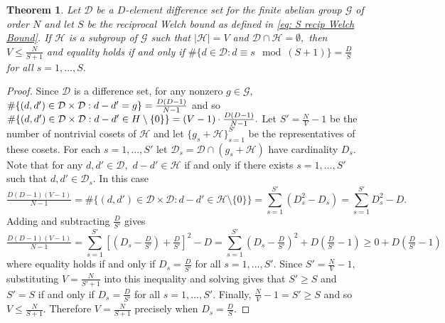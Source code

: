\documentclass[3p,11pt]{elsarticle}
\newcommand{\bbC}{\mathbb{C}}
\newcommand{\bfx}{\mathbf{x}}
\newcommand{\calD}{\mathcal{D}}
\newcommand{\calG}{\mathcal{G}}
\newcommand{\calH}{\mathcal{H}}
\newcommand{\abs}[1]{|{#1}|}
\newtheorem{theorem}{Theorem}[section]
\theoremstyle{definition}
\begin{document}
\begin{theorem}
\label{thm:Maximum V} 
Let $\calD$ be a $D$-element difference set for the finite abelian group $\calG$ of order $N$ and let $S$ be the reciprocal Welch bound as defined in \eqref{eq: S recip Welch Bound}. If $\calH$ is a subgroup of $\calG$ such that $\abs{\calH}=V$ and $\calD\cap\calH=\emptyset,$ then $V\leq\tfrac{N}{S+1}$ and equality holds if and only if $\#\{d\in\calD:d\equiv s\mod(S+1)\}=\tfrac{D}{S}$ for all $s=1,...,S.$
\end{theorem}
\begin{proof}
Since $\calD$ is a difference set, for any nonzero $g\in\calG,$ $\#\{(d,d')\in\calD\times\calD:d-d'=g\}=\smash{\tfrac{D(D-1)}{N-1}}$ and so $\#\{(d,d')\in\calD\times\calD:d-d'\in H\setminus\{0\}\}=(V-1)\cdot\smash{\tfrac{D(D-1)}{N-1}}.$ Let $S'=\tfrac{N}{V}-1$ be the number of nontrivial cosets of $\calH$ and let $\{g_s+\calH\}_{s=1}^{S'}$ be the representatives of these cosets. For each $s=1,...,S'$ let $\calD_s=\calD\cap(g_s+\calH)$ have cardinality $D_s.$ Note that for any $d,d'\in\calD,$ $d-d'\in\calH$ if and only if there exists $s=1,...,S'$ such that $d,d'\in\calD_s.$ In this case
\begin{equation*}
\tfrac{D(D-1)(V-1)}{N-1}=\#\{(d,d')\in\calD\times\calD:d-d'\in\calH\setminus\{0\}\}=\sum_{s=1}^{S'}(D_s^2-D_s)=\sum_{s=1}^{S'}D_s^2-D.
\end{equation*}
Adding and subtracting $\tfrac{D}{S'}$ gives
\begin{equation*}
\tfrac{D(D-1)(V-1)}{N-1}=\sum_{s=1}^{S'}\left[\left(D_s-\tfrac{D}{S'}\right)+\tfrac{D}{S'}\right]^2-D=\sum_{s=1}^{S'}\left(D_s-\tfrac{D}{S'}\right)^2+D\left(\tfrac{D}{S'}-1\right)\geq 0+D\left(\tfrac{D}{S'}-1\right)
\end{equation*}
where equality holds if and only if $D_s=\tfrac{D}{S'}$ for all $s=1,...,S'.$ Since $S'=\tfrac{N}{V}-1,$ substituting $V=\tfrac{N}{S'+1}$ into this inequality and solving gives that $S'\geq S$ and $S'=S$ if and only if $D_s=\tfrac{D}{S'}$ for all $s=1,...,S'$. Finally, $\tfrac{N}{V}-1=S'\geq S$ and so $V\leq\tfrac{N}{S+1}.$ Therefore $V=\tfrac{N}{S+1}$ precisely when $D_s=\tfrac{D}{S}.$
\end{proof}


\end{document}
